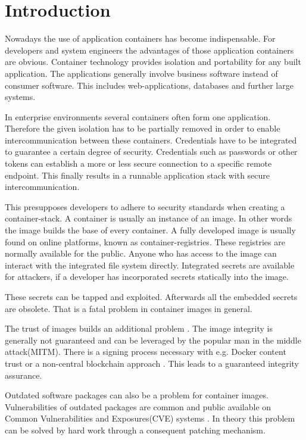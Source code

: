 \chapter{Introduction}
\label{ch:intro}

Nowadays the use of application containers has become indispensable. 
For developers and system engineers the advantages of those application containers are obvious. 
Container technology provides isolation and portability for any built application. 
The applications generally involve business software instead of consumer software. 
This includes web-applications, databases and further large systems. 

In enterprise environments several containers often form one application. 
Therefore the given isolation has to be partially removed in order to enable intercommunication between these containers. 
Credentials have to be integrated to guarantee a certain degree of security. 
Credentials such as passwords or other tokens can establish a more or less secure connection to a specific remote endpoint. 
This finally results in a runnable application stack with secure intercommunication.

This presupposes developers to adhere to security standards when creating a container-stack. 
A container is usually an instance of an image. In other words the image builds the base of every container. 
A fully developed image is usually found on online platforms, known as container-registries. 
These registries are normally available for the public. 
Anyone who has access to the image can interact with the integrated file system directly.
Integrated secrets are available for attackers, if a developer has incorporated secrets statically into the image.
 
These secrets can be tapped and exploited. Afterwards all the embedded secrets are obsolete. That is a fatal problem in container images in general.

The trust of images builds an additional problem \cite{to_docker_or_not}.
The image integrity is generally not guaranteed and can be leveraged by the popular man in the middle attack(MITM). There is a signing process necessary with e.g. Docker content trust or a non-central blockchain approach \cite{Xu2018}. This leads to a guaranteed integrity assurance.

Outdated software packages can also be a problem for container images. Vulnerabilities of outdated packages are common and public available on Common Vulnerabilities and Exposures(CVE) systems \cite{10.1007/978-3-319-94289-6_8}. In theory this problem can be solved by hard work through a consequent patching mechanism. 

